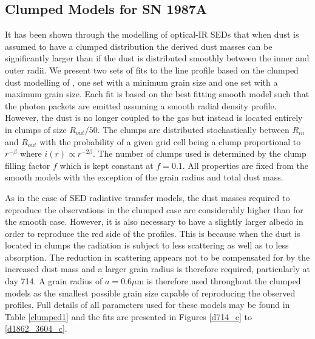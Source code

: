 \documentclass[useAMS,usenatbib,usegraphicx]{mnras}
\begin{document}
\subsection{Clumped Models for SN 1987A}
\label{clumped_models}


It has been shown through the modelling of optical-IR SEDs that when dust 
is assumed to have a clumped distribution the derived dust masses can be 
significantly larger than if the dust is distributed smoothly between the 
inner and outer radii.  We present two sets of fits to the line profile based on 
the clumped dust modelling of \citet{Wesson2015}, one set with a minimum grain size and one set with a maximum grain size.  Each fit is based on the best 
fitting smooth model such that the photon packets are emitted assuming a smooth 
radial density profile.  However, the dust is no longer coupled to the gas 
but instead is located entirely in clumps of size $R_{out}/50$.  The 
clumps are distributed stochastically between $R_{in}$ and $R_{out}$ with 
the probability of a given grid cell being a clump proportional to $r^{- 
\beta }$ where $i(r) \propto r^{-2 \beta}$.  The number of clumps used is 
determined by the clump filling factor $f$ which is kept constant at $f=0.1$.  All 
properties are fixed from the smooth models with the exception of the grain 
radius and total dust mass.

As in the case of SED radiative transfer models, the dust masses required to reproduce the 
observations in the clumped case are considerably higher than for the smooth case.  
However, it is also necessary to have a slightly larger albedo in order to 
reproduce the red side of the profiles.  This is because when 
the dust is located in clumps the radiation is subject to less scattering 
as well as to less absorption.  The reduction in scattering appears not to be 
compensated for by the increased dust mass and a larger grain radius is 
therefore required, particularly at day 714.  A grain radius of $a=0.6\mu$m 
is therefore used throughout the clumped models as the smallest possible 
grain size capable of reproducing the observed profiles. Full details of all 
parameters used for these models may be found in Table \ref{clumped1} and 
the fits are presented in Figures \ref{d714_c} to \ref{d1862_3604_c}.
\end{document}
